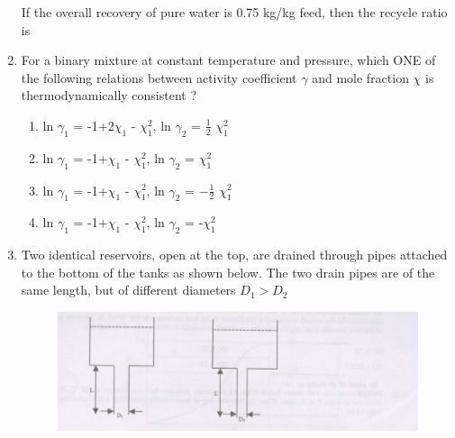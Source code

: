 \documentclass[journal,12pt,onecolumn]{IEEEtran}
\theoremstyle{remark}
\begin{document}
\begin{enumerate}
		If the overall recovery of pure water  is 0.75 kg/kg feed, then the recycle ratio  is 
		\begin{enumerate}
		\end{enumerate}
		
		\hfill \brak{\text{GATE CH 2009}}
		
		\item For a binary mixture at constant temperature and pressure, which ONE of the following relations between activity coefficient $\gamma$ and mole fraction $\chi$ is thermodynamically consistent ? 
		\begin{enumerate}
			\item ln $\gamma_1$ = -1+2$\chi_{1}$ - $\chi_{1}^2$, ln $\gamma_{2}$ = $\frac{1}{2}$ $\chi_{1}^2$
			\item ln $\gamma_{1}$ = -1+$\chi_{1}$ - $\chi_{1}^2$, ln $\gamma_{2}$ = $\chi_{1}^2$
			\item ln $\gamma_{1}$ = -1+$\chi_{1}$ - $\chi_{1}^2$, ln $\gamma_{2}$ = $-\frac{1}{2}$ $\chi_{1}^2$
			\item ln $\gamma_{1}$ = -1+$\chi_{1}$ - $\chi_{1}^2$, ln $\gamma_{2}$ = -$\chi_{1}^2$
		\end{enumerate}
		
		\hfill {}
		
		\item Two identical reservoirs, open at the top, are drained through pipes attached to the bottom of the tanks as shown below. The two drain pipes are of the same length, but of different diameters $D_1>D_2$
		
		\begin{figure}[H]
			\centering
			\includegraphics[width = 0.7\columnwidth]{q30.png}
			\caption{}
			\label{fig:Q30}
		\end{figure}
		

\end{enumerate}
\end{document}
